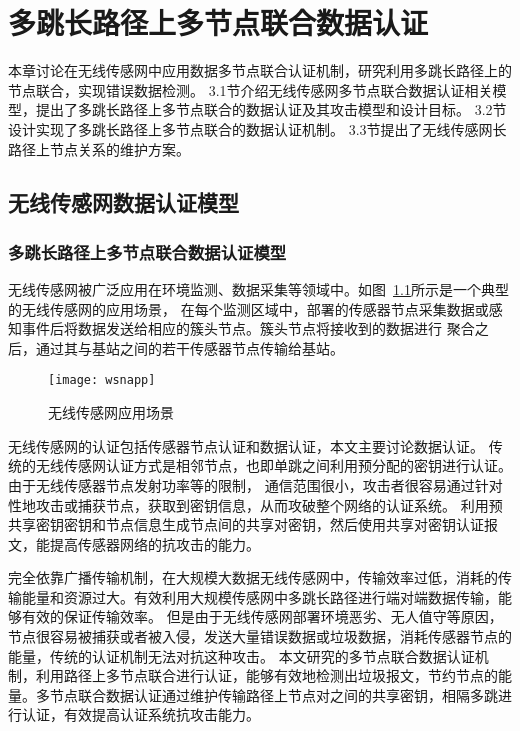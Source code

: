\chapter{多跳长路径上多节点联合数据认证}
本章讨论在无线传感网中应用数据多节点联合认证机制，研究利用多跳长路径上的节点联合，实现错误数据检测。
3.1节介绍无线传感网多节点联合数据认证相关模型，提出了多跳长路径上多节点联合的数据认证及其攻击模型和设计目标。
3.2节设计实现了多跳长路径上多节点联合的数据认证机制。
3.3节提出了无线传感网长路径上节点关系的维护方案。

\section{无线传感网数据认证模型}

\subsection{多跳长路径上多节点联合数据认证模型}
无线传感网被广泛应用在环境监测、数据采集等领域中。如图~\ref{fig:wsn}所示是一个典型的无线传感网的应用场景，
在每个监测区域中，部署的传感器节点采集数据或感知事件后将数据发送给相应的簇头节点。簇头节点将接收到的数据进行
聚合之后，通过其与基站之间的若干传感器节点传输给基站。
\begin{figure}[htbp]
  \centering
  \texttt{[image: wsnapp]}
  \caption{无线传感网应用场景}
  \label{fig:wsn}
\end{figure}

无线传感网的认证包括传感器节点认证和数据认证，本文主要讨论数据认证。
传统的无线传感网认证方式是相邻节点，也即单跳之间利用预分配的密钥进行认证。由于无线传感器节点发射功率等的限制，
通信范围很小，攻击者很容易通过针对性地攻击或捕获节点，获取到密钥信息，从而攻破整个网络的认证系统。
利用预共享密钥密钥和节点信息生成节点间的共享对密钥，然后使用共享对密钥认证报文，能提高传感器网络的抗攻击的能力。

完全依靠广播传输机制，在大规模大数据无线传感网中，传输效率过低，消耗的传输能量和资源过大。有效利用大规模传感网中多跳长路径进行端对端数据传输，能够有效的保证传输效率。
但是由于无线传感网部署环境恶劣、无人值守等原因，节点很容易被捕获或者被入侵，发送大量错误数据或垃圾数据，消耗传感器节点的能量，传统的认证机制无法对抗这种攻击。
本文研究的多节点联合数据认证机制，利用路径上多节点联合进行认证，能够有效地检测出垃圾报文，节约节点的能量。多节点联合数据认证通过维护传输路径上节点对之间的共享密钥，相隔多跳进行认证，有效提高认证系统抗攻击能力。

